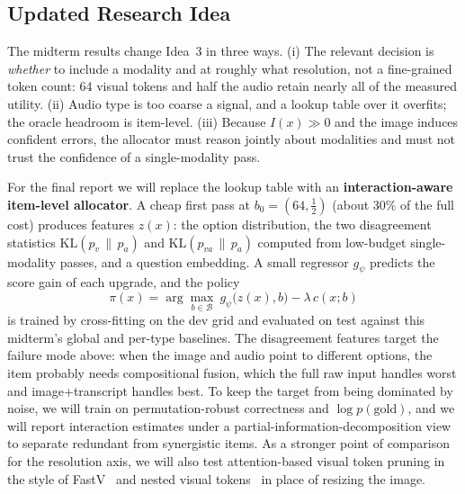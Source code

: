 \subsection{Updated Research Idea}

The midterm results change Idea~3 in three ways. (i) The relevant decision is
\emph{whether} to include a modality and at roughly what resolution, not a
fine-grained token count: 64 visual tokens and half the audio retain nearly
all of the measured utility. (ii) Audio type is too coarse a signal, and a
lookup table over it overfits; the oracle headroom is item-level. (iii)
Because $I(x)\gg0$ and the image induces confident errors, the allocator must
reason jointly about modalities and must not trust the confidence of a
single-modality pass.

For the final report we will replace the lookup table with an
\textbf{interaction-aware item-level allocator}. A cheap first pass at
$b_0=(64,\tfrac12)$ (about 30\% of the full cost) produces features
$z(x)$: the option distribution, the two disagreement statistics
$\mathrm{KL}(p_{v}\,\|\,p_{a})$ and $\mathrm{KL}(p_{va}\,\|\,p_{a})$ computed
from low-budget single-modality passes, and a question embedding. A small
regressor $g_\psi$ predicts the score gain of each upgrade, and the policy
\begin{equation}
\pi(x)=\arg\max_{b\in\mathcal{B}}\ g_\psi\big(z(x),b\big)-\lambda\,c(x;b)
\end{equation}
is trained by cross-fitting on the dev grid and evaluated on test against
this midterm's global and per-type baselines. The disagreement features target
the failure mode above: when the image and audio point to different options,
the item probably needs compositional fusion, which the full raw input
handles worst and image+transcript handles best. To keep the target from being
dominated by noise, we will train on permutation-robust correctness and
$\log p(\text{gold})$, and we will report interaction estimates under a
partial-information-decomposition view~\citep{liang2023pid} to separate
redundant from synergistic items. As a stronger point of comparison for the
resolution axis, we will also test attention-based visual token pruning in
the style of FastV~\citep{chen2024fastv} and nested visual
tokens~\citep{cai2024matryoshka} in place of resizing the image.
